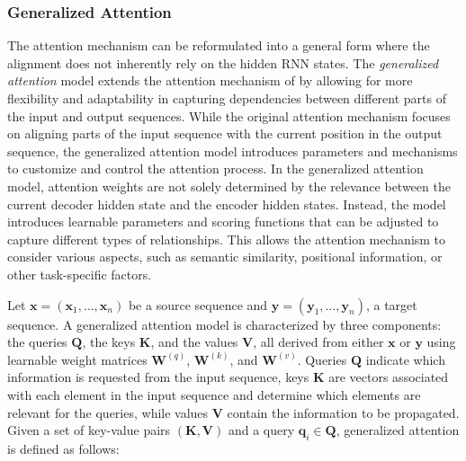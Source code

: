 \subsubsection{Generalized Attention} 

The attention mechanism can be reformulated into a general form where the alignment does not inherently rely on the hidden \ac{RNN} states. The \textit{generalized attention} model \citep{chaudhari2021attentive} extends the attention mechanism of \citet{bahdanau2014neural} by allowing for more flexibility and adaptability in capturing dependencies between different parts of the input and output sequences. While the original attention mechanism focuses on aligning parts of the input sequence with the current position in the output sequence, the generalized attention model introduces parameters and mechanisms to customize and control the attention process. In the generalized attention model, attention weights are not solely determined by the relevance between the current decoder hidden state and the encoder hidden states. Instead, the model introduces learnable parameters and scoring functions that can be adjusted to capture different types of relationships. This allows the attention mechanism to consider various aspects, such as semantic similarity, positional information, or other task-specific factors.

Let $\bm{x} = (\bm{x}_1, \ldots, \bm{x}_n)$ be a source sequence and $\bm{y} = (\bm{y}_1, \ldots, \bm{y}_n)$, a target sequence. A generalized attention model is characterized by three components: the queries $\bm{Q}$, the keys $\bm{K}$, and the values $\bm{V}$, all derived from either $\bm{x}$ or $\bm{y}$ using learnable weight matrices $\bm{W}^{(q)}$, $\bm{W}^{(k)}$, and $\bm{W}^{(v)}$. Queries $\bm{Q}$ indicate which information is requested from the input sequence, keys $\bm{K}$ are vectors associated with each element in the input sequence and determine which elements are relevant for the queries, while values $\bm{V}$ contain the information to be propagated. Given a set of key-value pairs $(\bm{K}, \bm{V})$ and a query $\bm{q}_i \in \bm{Q}$, generalized attention is defined as follows:



